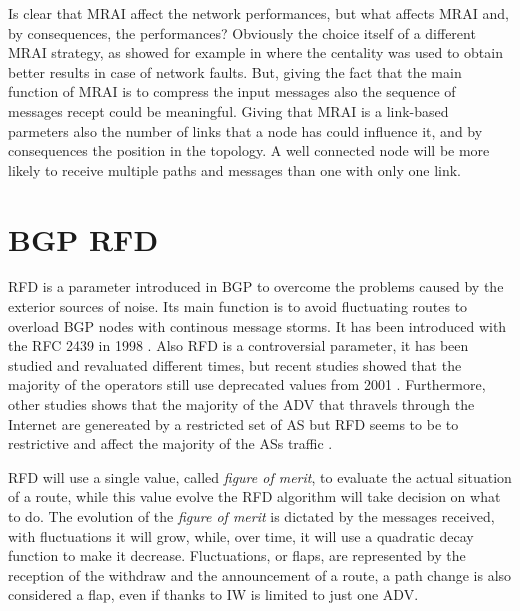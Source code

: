 Is clear that \ac{MRAI} affect the network performances, but what affects \ac{MRAI}
and, by consequences, the performances?
Obviously the choice itself of a different \ac{MRAI} strategy, as showed for 
example in \cite{milani2019BGP} where the centality was used to obtain better
results in case of network faults.
But, giving the fact that the main function of \ac{MRAI} is to compress the 
input messages also the sequence of messages recept could be meaningful.
Giving that \ac{MRAI} is a link-based parmeters also the number of links that
a node has could influence it, and by consequences the position in the topology.
A well connected node will be more likely to receive multiple paths and messages
than one with only one link.


\section{BGP RFD}
\label{sec:bgp_rfd}

\ac{RFD} is a parameter introduced in \ac{BGP} to overcome the problems caused
by the exterior sources of noise.
Its main function is to avoid fluctuating routes to overload \ac{BGP} nodes 
with continous message storms.
It has been introduced with the \ac{RFC} \num{2439} in \num{1998} \cite{rfc2439}.
Also \ac{RFD} is a controversial parameter, it has been studied and revaluated
different times, but recent studies showed that the majority of the operators 
still use deprecated values from \num{2001} \cite{gray2020bgp}.
Furthermore, other studies shows that the majority of the \ac{ADV} that thravels
through the Internet are genereated by a restricted set of \ac{AS} but \ac{RFD}
seems to be to restrictive and affect the majority of the \acp{AS} traffic
\cite{pelsser2011route}.

\ac{RFD} will use a single value, called \textit{figure of merit}, to evaluate
the actual situation of a route, while this value evolve the \ac{RFD} algorithm
will take decision on what to do.
The evolution of the \textit{figure of merit} is dictated by the messages received,
with fluctuations it will grow, while, over time, it will use a quadratic decay
function to make it decrease.
Fluctuations, or flaps, are represented by the reception of the withdraw and
the announcement of a route, a path change is also considered a flap, even
if thanks to \ac{IW} is limited to just one \ac{ADV}.

